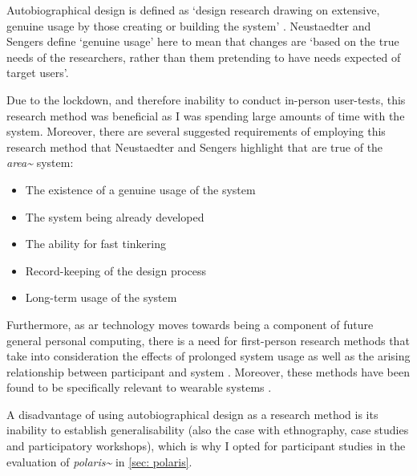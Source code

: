 Autobiographical design is defined as `design research drawing on extensive, genuine usage by those creating or building the system' \citep{neustaedter2012}. Neustaedter and Sengers define `genuine usage' here to mean that changes are `based on the true needs of the researchers, rather than them pretending to have needs expected of target users'.

Due to the lockdown, and therefore inability to conduct in-person user-tests, this research method was beneficial as I was spending large amounts of time with the system. Moreover, there are several suggested requirements of employing this research method that Neustaedter and Sengers highlight that are true of the \textit{area\textasciitilde{}} system:
\begin{itemize}
    \item The existence of a genuine usage of the system
    \item The system being already developed
    \item The ability for fast tinkering 
    \item Record-keeping of the design process
    \item Long-term usage of the system
\end{itemize}
Furthermore, as \gls{ar} technology moves towards being a component of future general personal computing, there is a need for first-person research methods that take into consideration the effects of prolonged system usage as well as the arising relationship between participant and system \citep{desjardins2018}. Moreover, these methods have been found to be specifically relevant to wearable systems \citep{cecchinato2017}.

A disadvantage of using autobiographical design as a research method is its inability to establish generalisability (also the case with ethnography, case studies and participatory workshops), which is why I opted for participant studies in the evaluation of \textit{polaris\textasciitilde{}} in \autoref{sec: polaris}.

